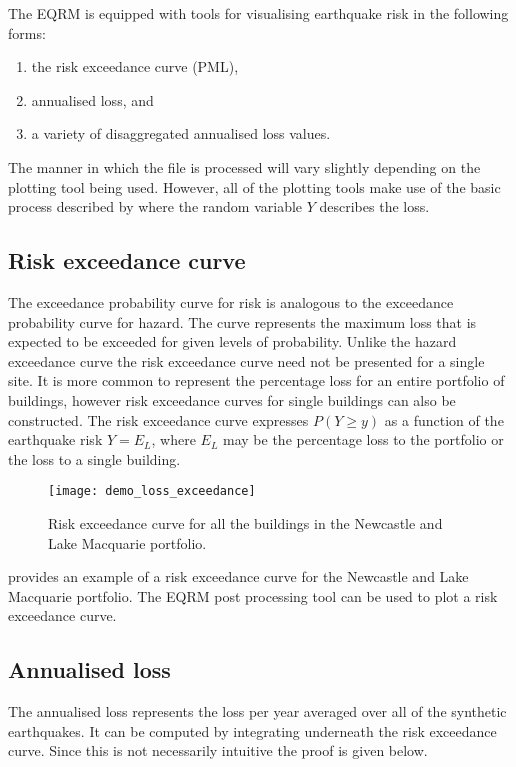 The EQRM is equipped with tools for visualising earthquake risk in
the following forms:
\begin{enumerate}
\item the risk exceedance curve (PML), \item annualised loss, and
\item a variety of disaggregated annualised loss values.
\end{enumerate}
The manner in which the
 file is processed
will vary slightly depending on the plotting tool being used.
However, all of the plotting tools make use of the basic process
described by  where the
random variable $Y$ describes the loss. 

\subsection{Risk exceedance curve}

The exceedance probability curve for risk is analogous to the
exceedance probability curve for hazard. The curve represents the
maximum loss that is expected to be exceeded for given levels of
probability. Unlike the hazard exceedance curve the risk
exceedance curve need not be presented for a single site. It is
more common to represent the percentage loss for an entire
portfolio of buildings, however risk exceedance curves for single
buildings can also be constructed. The risk exceedance curve
expresses $P(Y \ge y)$ as a function of the earthquake risk
$Y=E_L$, where $E_L$ may be the percentage loss to the portfolio
or the loss to a single building.
\begin{figure}
\texttt{[image: demo\_loss\_exceedance]}
\caption{Risk exceedance curve for all the buildings in the
Newcastle and Lake Macquarie portfolio.} \label{fig-risk-pml}
\end{figure}
 provides an example of a risk exceedance curve
for the Newcastle and Lake Macquarie portfolio.  The
EQRM post processing tool
 can be used
 to plot a
risk exceedance curve.

\subsection{Annualised loss}

The annualised loss represents the loss per year averaged over all
of the synthetic earthquakes. It can be computed by integrating
underneath the risk exceedance curve. Since this is not
necessarily intuitive the proof is given below.

